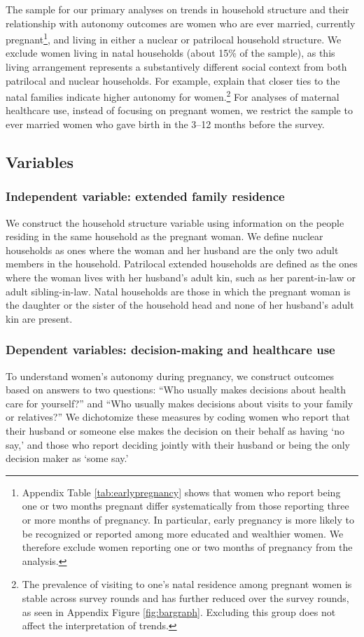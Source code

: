 \documentclass[10pt,twoside,reqno]{article}
\begin{document}
The sample for our primary analyses on trends in household structure and their relationship with autonomy outcomes are women who are ever married, currently pregnant\footnote{Appendix Table \ref{tab:earlypregnancy} shows that women who report being one or two months pregnant differ systematically from those reporting three or more months of pregnancy. In particular, early pregnancy is more likely to be recognized or reported among more educated and wealthier women. We therefore exclude women reporting one or two months of pregnancy from the analysis.}, and living in either a nuclear or patrilocal household structure. We exclude women living in natal households (about 15\% of the sample), as this living arrangement represents a substantively different social context from both patrilocal and nuclear households. For example, \cite{dyson1983kinship} explain that closer ties to the natal families indicate higher autonomy for women.\footnote{The prevalence of visiting to one's natal residence among pregnant women is stable across survey rounds and has further reduced over the survey rounds, as seen in Appendix Figure \ref{fig:bargraph}.  Excluding this group does not affect the interpretation of trends.} For analyses of maternal healthcare use, instead of focusing on pregnant women, we restrict the sample to ever married women who gave birth in the 3--12 months before the survey.

\subsection{Variables}

\subsubsection{Independent variable: extended family residence} \label{sec:def_hhstruc}
We construct the household structure variable using information on the people residing in the same household as the pregnant woman. We define nuclear households as ones where the woman and her husband are the only two adult members in the household. Patrilocal extended households are defined as the ones where the woman lives with her husband’s adult kin, such as her parent-in-law or adult sibling-in-law. Natal households are those in which the pregnant woman is the daughter or the sister of the household head and none of her husband’s adult kin are present. 

\subsubsection{Dependent variables: decision-making and healthcare use} \label{sec:outcomes}
To understand women's autonomy during pregnancy, we construct outcomes based on answers to two questions: ``Who usually makes decisions about health care for yourself?'' and ``Who usually makes decisions about visits to your family or relatives?'' We dichotomize these measures by coding women who report that their husband or someone else makes the decision on their behalf as having ‘no say,’ and those who report deciding jointly with their husband or being the only decision maker as ‘some say.’
\end{document}

